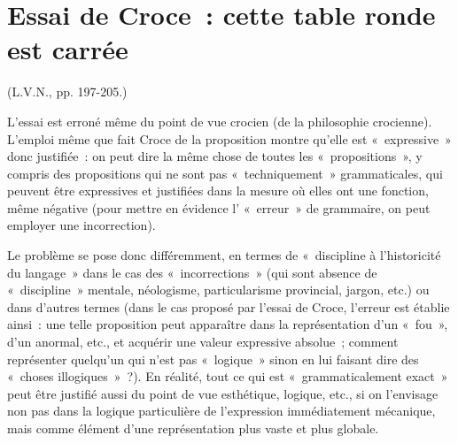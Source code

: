 \documentclass[french,twoside]{book} %
\newcommand\chaptercont{} %
\begin{document}
\chaptercont
\section[{Essai de Croce : cette table ronde est carrée}]{Essai de Croce : cette table ronde est carrée\protect\footnotemark }
 (L.V.N., pp. 197-205.)\par
L'essai est erroné même du point de vue crocien (de la philosophie crocienne). L'emploi même que fait Croce de la proposition montre qu’elle est « expressive » donc justifiée : on peut dire la même chose de toutes les « propositions », y compris des propositions qui ne sont pas « techniquement » grammaticales, qui peuvent être expressives et justifiées dans la mesure où elles ont une fonction, même négative (pour mettre en évidence l’ « erreur » de grammaire, on peut employer une incorrection).\par
Le problème se pose donc différemment, en termes de « discipline à l’historicité du langage » dans le cas des « incorrections » (qui sont absence de « discipline » mentale, néologisme, particularisme provincial, jargon, etc.) ou dans d’autres termes (dans le cas proposé par l’essai de Croce, l’erreur est établie ainsi : une telle proposition peut apparaître dans la représentation d’un « fou », d’un anormal, etc., et acquérir une valeur expressive absolue ; comment représenter quelqu’un qui n’est pas « logique » sinon en lui faisant dire des « choses illogiques » ?). En réalité, tout ce qui est « grammaticalement exact » peut être justifié aussi du point de vue esthétique, logique, etc., si on l’envisage non pas dans la logique particulière de l’expression immédiatement mécanique, mais comme élément d’une représentation plus vaste et plus globale.\par
\end{document}
